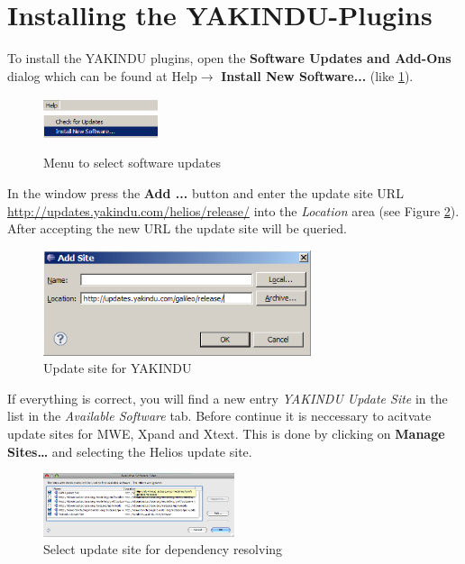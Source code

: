 \section{Installing the YAKINDU-Plugins}

To install the YAKINDU plugins, open the \textbf{Software Updates and Add-Ons}
dialog which can be found at Help$\rightarrow$ \textbf{Install New Software...} (like
\ref{fig:updatesMenu}). \begin{figure}[ht] \center
\includegraphics[width=0.3\textwidth]{Pictures/helpMenu}\\
\includegraphics[width=0.3\textwidth]{Pictures/softwareUpdates}
\caption{\label{fig:updatesMenu}Menu to select software updates} 
\end{figure}
In the window press the \textbf{Add ...} button and enter the update site URL
\url{http://updates.yakindu.com/helios/release/}
into the \textit{Location} area (see Figure \ref{fig:updateSite}). After
accepting the new URL the update site will be queried.

\begin{figure}[ht]
\center
\includegraphics[width=0.7\textwidth]{./Pictures/updateSite}
\caption{\label{fig:updateSite}Update site for YAKINDU} 
\end{figure}

If everything is correct, you will find a new entry \textit{YAKINDU Update Site}
in the list in the \textit{Available Software} tab. Before continue it is
neccessary to acitvate update sites for MWE, Xpand and Xtext. This is
done by clicking on \textbf{Manage Sites\dots} and selecting the Helios update site.
\begin{figure}[ht]
\center \includegraphics[width=0.5\textwidth]{./Pictures/manageSites}
\caption{\label{fig:manageSites}Select update site for dependency resolving} 
\end{figure}

